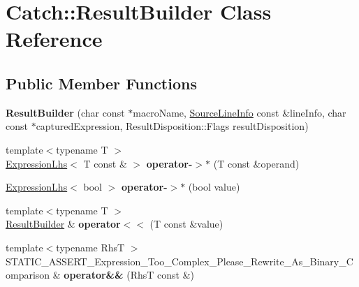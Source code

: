 \hypertarget{class_catch_1_1_result_builder}{}\section{Catch\+:\+:Result\+Builder Class Reference}
\label{class_catch_1_1_result_builder}
\subsection*{Public Member Functions}
\begin{DoxyCompactItemize}
\item 
\hypertarget{class_catch_1_1_result_builder_a18c2929702bdde1f835e39717a0e554b}{}{\bfseries Result\+Builder} (char const $\ast$macro\+Name, \hyperlink{struct_catch_1_1_source_line_info}{Source\+Line\+Info} const \&line\+Info, char const $\ast$captured\+Expression, Result\+Disposition\+::\+Flags result\+Disposition)\label{class_catch_1_1_result_builder_a18c2929702bdde1f835e39717a0e554b}

\item 
\hypertarget{class_catch_1_1_result_builder_ae0ab04cb09f26ffdc5c7dd9eec89e7c9}{}{\footnotesize template$<$typename T $>$ }\\\hyperlink{class_catch_1_1_expression_lhs}{Expression\+Lhs}$<$ T const \& $>$ {\bfseries operator-\/$>$$\ast$} (T const \&operand)\label{class_catch_1_1_result_builder_ae0ab04cb09f26ffdc5c7dd9eec89e7c9}

\item 
\hypertarget{class_catch_1_1_result_builder_af2b2645b38c8dca2de0b83650383c6bd}{}\hyperlink{class_catch_1_1_expression_lhs}{Expression\+Lhs}$<$ bool $>$ {\bfseries operator-\/$>$$\ast$} (bool value)\label{class_catch_1_1_result_builder_af2b2645b38c8dca2de0b83650383c6bd}

\item 
\hypertarget{class_catch_1_1_result_builder_a5aa79ce6160ab8cd800eb65bbd7a28a4}{}{\footnotesize template$<$typename T $>$ }\\\hyperlink{class_catch_1_1_result_builder}{Result\+Builder} \& {\bfseries operator$<$$<$} (T const \&value)\label{class_catch_1_1_result_builder_a5aa79ce6160ab8cd800eb65bbd7a28a4}

\item 
\hypertarget{class_catch_1_1_result_builder_a2bbd6b026765202aee224a14d24c68bc}{}{\footnotesize template$<$typename Rhs\+T $>$ }\\S\+T\+A\+T\+I\+C\+\_\+\+A\+S\+S\+E\+R\+T\+\_\+\+Expression\+\_\+\+Too\+\_\+\+Complex\+\_\+\+Please\+\_\+\+Rewrite\+\_\+\+As\+\_\+\+Binary\+\_\+\+Comparison \& {\bfseries operator\&\&} (Rhs\+T const \&)\label{class_catch_1_1_result_builder_a2bbd6b026765202aee224a14d24c68bc}


\end{DoxyCompactItemize}
